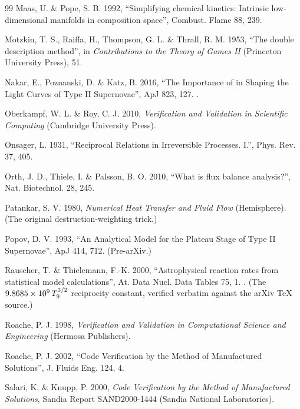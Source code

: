 \begin{thebibliography}{99}
Maas, U. \& Pope, S. B. 1992, ``Simplifying chemical kinetics: Intrinsic
low-dimensional manifolds in composition space'', Combust. Flame 88, 239.

Motzkin, T. S., Raiffa, H., Thompson, G. L. \& Thrall, R. M. 1953, ``The double
description method'', in \emph{Contributions to the Theory of Games II}
(Princeton University Press), 51.

Nakar, E., Poznanski, D. \& Katz, B. 2016, ``The Importance of  in
Shaping the Light Curves of Type II Supernovae'', ApJ 823, 127.
.

Oberkampf, W. L. \& Roy, C. J. 2010, \emph{Verification and Validation in
Scientific Computing} (Cambridge University Press).

Onsager, L. 1931, ``Reciprocal Relations in Irreversible Processes. I.'', Phys.
Rev. 37, 405.

Orth, J. D., Thiele, I. \& Palsson, B. O. 2010, ``What is flux balance
analysis?'', Nat. Biotechnol. 28, 245.

Patankar, S. V. 1980, \emph{Numerical Heat Transfer and Fluid Flow}
(Hemisphere). (The original destruction-weighting trick.)

Popov, D. V. 1993, ``An Analytical Model for the Plateau Stage of Type II
Supernovae'', ApJ 414, 712. (Pre-arXiv.)

Rauscher, T. \& Thielemann, F.-K. 2000, ``Astrophysical reaction rates from
statistical model calculations'', At. Data Nucl. Data Tables 75, 1.
. (The $9.8685\times10^{9}\,T_{9}^{3/2}$ reciprocity
constant, verified verbatim against the arXiv \TeX{} source.)

Roache, P. J. 1998, \emph{Verification and Validation in Computational Science
and Engineering} (Hermosa Publishers).

Roache, P. J. 2002, ``Code Verification by the Method of Manufactured
Solutions'', J. Fluids Eng. 124, 4.

Salari, K. \& Knupp, P. 2000, \emph{Code Verification by the Method of
Manufactured Solutions}, Sandia Report SAND2000-1444 (Sandia National
Laboratories).


\end{thebibliography}
